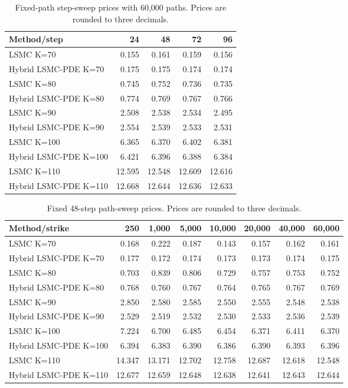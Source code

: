 \begin{table}[htbp]\centering
\caption{Fixed-path step-sweep prices with 60,000 paths. Prices are rounded to three decimals.}
\begin{tabular}{lrrrr}
\toprule
Method/step & 24 & 48 & 72 & 96 \\
\midrule
LSMC K=70 & 0.155 & 0.161 & 0.159 & 0.156 \\
Hybrid LSMC-PDE K=70 & 0.175 & 0.175 & 0.174 & 0.174 \\
LSMC K=80 & 0.745 & 0.752 & 0.736 & 0.735 \\
Hybrid LSMC-PDE K=80 & 0.774 & 0.769 & 0.767 & 0.766 \\
LSMC K=90 & 2.508 & 2.538 & 2.534 & 2.495 \\
Hybrid LSMC-PDE K=90 & 2.554 & 2.539 & 2.533 & 2.531 \\
LSMC K=100 & 6.365 & 6.370 & 6.402 & 6.381 \\
Hybrid LSMC-PDE K=100 & 6.421 & 6.396 & 6.388 & 6.384 \\
LSMC K=110 & 12.595 & 12.548 & 12.609 & 12.616 \\
Hybrid LSMC-PDE K=110 & 12.668 & 12.644 & 12.636 & 12.633 \\
\bottomrule
\end{tabular}
\end{table}

\begin{table}[htbp]\centering
\caption{Fixed 48-step path-sweep prices. Prices are rounded to three decimals.}
\begin{tabular}{lrrrrrrr}
\toprule
Method/strike & 250 & 1,000 & 5,000 & 10,000 & 20,000 & 40,000 & 60,000 \\
\midrule
LSMC K=70 & 0.168 & 0.222 & 0.187 & 0.143 & 0.157 & 0.162 & 0.161 \\
Hybrid LSMC-PDE K=70 & 0.177 & 0.172 & 0.174 & 0.173 & 0.173 & 0.174 & 0.175 \\
LSMC K=80 & 0.703 & 0.839 & 0.806 & 0.729 & 0.757 & 0.753 & 0.752 \\
Hybrid LSMC-PDE K=80 & 0.768 & 0.760 & 0.767 & 0.764 & 0.765 & 0.767 & 0.769 \\
LSMC K=90 & 2.850 & 2.580 & 2.585 & 2.550 & 2.555 & 2.548 & 2.538 \\
Hybrid LSMC-PDE K=90 & 2.529 & 2.519 & 2.532 & 2.530 & 2.533 & 2.536 & 2.539 \\
LSMC K=100 & 7.224 & 6.700 & 6.485 & 6.454 & 6.371 & 6.411 & 6.370 \\
Hybrid LSMC-PDE K=100 & 6.394 & 6.383 & 6.390 & 6.386 & 6.390 & 6.393 & 6.396 \\
LSMC K=110 & 14.347 & 13.171 & 12.702 & 12.758 & 12.687 & 12.618 & 12.548 \\
Hybrid LSMC-PDE K=110 & 12.677 & 12.659 & 12.648 & 12.638 & 12.641 & 12.643 & 12.644 \\
\bottomrule
\end{tabular}
\end{table}

